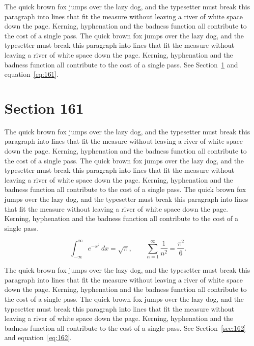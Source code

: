 \documentclass{article}
\begin{document}
The quick brown fox jumps over the lazy dog, and the typesetter must break this paragraph into lines that fit the measure without leaving a river of white space down the page. Kerning, hyphenation and the badness function all contribute to the cost of a single pass. The quick brown fox jumps over the lazy dog, and the typesetter must break this paragraph into lines that fit the measure without leaving a river of white space down the page. Kerning, hyphenation and the badness function all contribute to the cost of a single pass. 
See Section~\ref{sec:161} and equation~\eqref{eq:161}.
\section{Section 161}
\label{sec:161}
The quick brown fox jumps over the lazy dog, and the typesetter must break this paragraph into lines that fit the measure without leaving a river of white space down the page. Kerning, hyphenation and the badness function all contribute to the cost of a single pass. The quick brown fox jumps over the lazy dog, and the typesetter must break this paragraph into lines that fit the measure without leaving a river of white space down the page. Kerning, hyphenation and the badness function all contribute to the cost of a single pass. The quick brown fox jumps over the lazy dog, and the typesetter must break this paragraph into lines that fit the measure without leaving a river of white space down the page. Kerning, hyphenation and the badness function all contribute to the cost of a single pass. 

\begin{equation}\label{eq:161}
\int_{-\infty}^{\infty} e^{-x^{2}}\,dx = \sqrt{\pi}, \qquad
\sum_{n=1}^{\infty} \frac{1}{n^{2}} = \frac{\pi^{2}}{6}.
\end{equation}

The quick brown fox jumps over the lazy dog, and the typesetter must break this paragraph into lines that fit the measure without leaving a river of white space down the page. Kerning, hyphenation and the badness function all contribute to the cost of a single pass. The quick brown fox jumps over the lazy dog, and the typesetter must break this paragraph into lines that fit the measure without leaving a river of white space down the page. Kerning, hyphenation and the badness function all contribute to the cost of a single pass. 
See Section~\ref{sec:162} and equation~\eqref{eq:162}.
\end{document}
